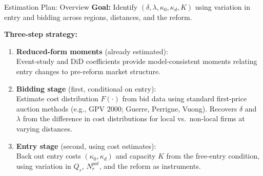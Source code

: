 \documentclass[9pt,aspectratio=169]{beamer}
\begin{document}
\begin{frame}{Estimation Plan: Overview}
\textbf{Goal:} Identify $(\delta, \lambda, \kappa_0, \kappa_d, K)$ using
variation in entry and bidding across regions, distances, and the reform.

\bigskip
\textbf{Three-step strategy:}
\begin{enumerate}
  \item \textbf{Reduced-form moments} (already estimated):\\
        Event-study and DiD coefficients provide model-consistent
        moments relating entry changes to pre-reform market structure.

  \vspace{0.3em}
  \item \textbf{Bidding stage} (first, conditional on entry):\\
        Estimate cost distribution $F(\cdot)$ from bid data using
        standard first-price auction methods (e.g., GPV 2000;
        Guerre, Perrigne, Vuong). Recovers $\delta$ and $\lambda$
        from the difference in cost distributions for local vs.\
        non-local firms at varying distances.

  \vspace{0.3em}
  \item \textbf{Entry stage} (second, using cost estimates):\\
        Back out entry costs $(\kappa_0, \kappa_d)$ and capacity $K$
        from the free-entry condition, using variation in $Q_r$,
        $N_r^{pot}$, and the reform as instruments.
\end{enumerate}
\end{frame}
\end{document}
